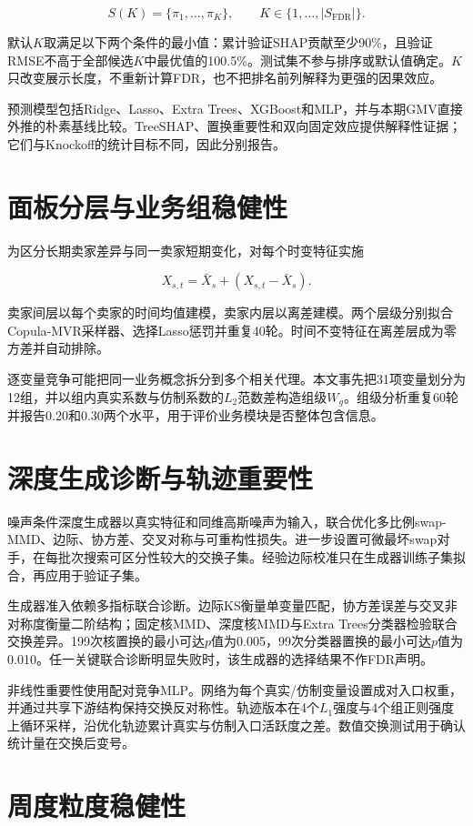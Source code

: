 \documentclass{sufethesismas}
\begin{document}
\[
S(K)=\{\pi_1,\ldots,\pi_K\},\qquad K\in\{1,\ldots,|S_{\mathrm{FDR}}|\}.
\]

默认\(K\)取满足以下两个条件的最小值：累计验证SHAP贡献至少90\%，且验证RMSE不高于全部候选\(K\)中最优值的100.5\%。测试集不参与排序或默认值确定。\(K\)只改变展示长度，不重新计算FDR，也不把排名前列解释为更强的因果效应。

预测模型包括Ridge、Lasso、Extra Trees、XGBoost和MLP，并与本期GMV直接外推的朴素基线比较。TreeSHAP、置换重要性和双向固定效应提供解释性证据；它们与Knockoff的统计目标不同，因此分别报告。

\section{面板分层与业务组稳健性}

为区分长期卖家差异与同一卖家短期变化，对每个时变特征实施

\[
X_{s,t}=\bar X_s+(X_{s,t}-\bar X_s).
\]

卖家间层以每个卖家的时间均值建模，卖家内层以离差建模。两个层级分别拟合Copula-MVR采样器、选择Lasso惩罚并重复40轮。时间不变特征在离差层成为零方差并自动排除。

逐变量竞争可能把同一业务概念拆分到多个相关代理。本文事先把31项变量划分为12组，并以组内真实系数与仿制系数的\(L_2\)范数差构造组级\(W_g\)。组级分析重复60轮并报告0.20和0.30两个水平，用于评价业务模块是否整体包含信息。

\section{深度生成诊断与轨迹重要性}

噪声条件深度生成器以真实特征和同维高斯噪声为输入，联合优化多比例swap-MMD、边际、协方差、交叉对称与可重构性损失。进一步设置可微最坏swap对手，在每批次搜索可区分性较大的交换子集。经验边际校准只在生成器训练子集拟合，再应用于验证子集。

生成器准入依赖多指标联合诊断。边际KS衡量单变量匹配，协方差误差与交叉非对称度衡量二阶结构；固定核MMD、深度核MMD与Extra Trees分类器检验联合交换差异。199次核置换的最小可达\(p\)值为0.005，99次分类器置换的最小可达\(p\)值为0.010。任一关键联合诊断明显失败时，该生成器的选择结果不作FDR声明。

非线性重要性使用配对竞争MLP。网络为每个真实/仿制变量设置成对入口权重，并通过共享下游结构保持交换反对称性。轨迹版本在4个\(L_1\)强度与4个组正则强度上循环采样，沿优化轨迹累计真实与仿制入口活跃度之差。数值交换测试用于确认统计量在交换后变号。

\section{周度粒度稳健性}
\end{document}
